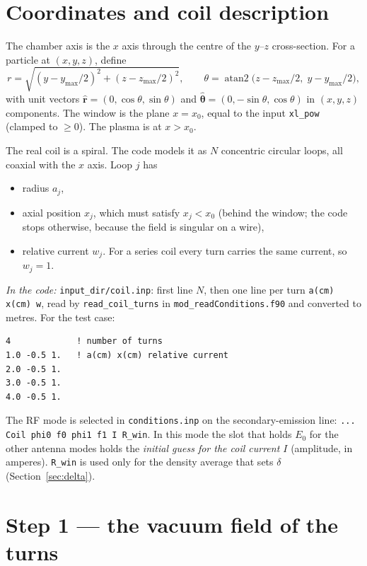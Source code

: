 \documentclass[11pt,a4paper]{article}
\newcommand{\code}[1]{\texttt{#1}}
\newcommand{\incode}[1]{\par\smallskip\noindent\textit{In the code:} #1\par\smallskip}
\begin{document}
\section{Coordinates and coil description}

The chamber axis is the $x$ axis through the centre of the $y$--$z$
cross-section. For a particle at $(x,y,z)$, define
\begin{equation}
  r = \sqrt{(y-y_{\max}/2)^2 + (z-z_{\max}/2)^2}, \qquad
  \theta = \operatorname{atan2}\!\big(z-z_{\max}/2,\; y-y_{\max}/2\big),
\end{equation}
with unit vectors
$\hat{\mathbf r} = (0,\cos\theta,\sin\theta)$ and
$\hat{\boldsymbol\theta} = (0,-\sin\theta,\cos\theta)$ in $(x,y,z)$
components. The window is the plane $x = x_0$, equal to the input
\code{xl\_pow} (clamped to $\ge 0$). The plasma is at $x > x_0$.

The real coil is a spiral. The code models it as $N$ concentric circular
loops, all coaxial with the $x$ axis. Loop $j$ has
\begin{itemize}
  \item radius $a_j$,
  \item axial position $x_j$, which must satisfy $x_j < x_0$ (behind the
        window; the code stops otherwise, because the field is singular on
        a wire),
  \item relative current $w_j$. For a series coil every turn carries the
        same current, so $w_j = 1$.
\end{itemize}

\incode{\code{input\_dir/coil.inp}: first line $N$, then one line per turn
\code{a(cm) x(cm) w}, read by \code{read\_coil\_turns} in
\code{mod\_readConditions.f90} and converted to metres. For the test case:}
\begin{verbatim}
4             ! number of turns
1.0 -0.5 1.   ! a(cm) x(cm) relative current
2.0 -0.5 1.
3.0 -0.5 1.
4.0 -0.5 1.
\end{verbatim}
The RF mode is selected in \code{conditions.inp} on the secondary-emission
line: \code{... Coil phi0 f0 phi1 f1 I R\_win}. In this mode the slot that
holds $E_0$ for the other antenna modes holds the \emph{initial guess for
the coil current $I$} (amplitude, in amperes). \code{R\_win} is used only for
the density average that sets $\delta$ (Section~\ref{sec:delta}).

\section{Step 1 --- the vacuum field of the turns}
\end{document}
